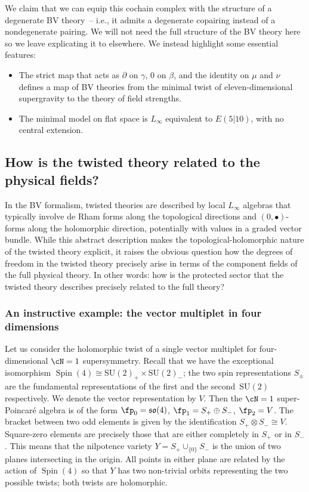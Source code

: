 \documentclass[10pt,a4paper]{amsart}
\numberwithin{equation}{section}
\theoremstyle{definition}
\def\lie#1{\ensuremath{\mathfrak{#1}}}
\DeclareMathOperator{\Spin}{Spin}
\def\so{\lie{so}}
\def\SU{\ensuremath{\mathrm{SU}}}
\begin{document}
We claim that we can equip this cochain complex with the structure of a degenerate BV theory~-- i.e., it admits a degenerate copairing instead of a nondegenerate pairing. We will not need the full structure of the BV theory here so we leave explicating it to elsewhere. We instead highlight some essential features:
\begin{itemize}\itemsep=0pt
 \item[--] The strict map that acts as $\partial$ on $\gamma$, $0$ on $\beta$, and the identity on $\mu$ and $\nu$ defines a map of BV theories from the minimal twist of eleven-dimensional supergravity to the theory of field strengths.
 \item[--] The minimal model on flat space is $L_\infty$ equivalent to $E(5|10)$, with no central extension.
\end{itemize}

\subsection{How is the twisted theory related to the physical fields?}
In the BV formalism, twisted theories are described by local $L_\infty$ algebras that typically involve de Rham forms along the topological directions and $(0,\bullet)$-forms along the holomorphic direction, potentially with values in a graded vector bundle. While this abstract description makes the topological-holomorphic nature of the twisted theory explicit, it raises the obvious question how the degrees of freedom in the twisted theory precisely arise in terms of the component fields of the full physical theory. In other words: how is the protected sector that the twisted theory describes precisely related to the full theory?

\subsubsection{An instructive example: the vector multiplet in four dimensions}
Let us consider the holomorphic twist of a single vector multiplet for four-dimensional $\cN=1$ supersymmetry. Recall that we have the exceptional isomorphism $\Spin(4) \cong \SU(2)_+ \times \SU(2)_-$; the two spin representations $S_\pm$ are the fundamental representations of the first and the second~$\SU(2)$ respectively. We denote the vector representation by $V$. Then the $\cN=1$ super-Poincar\'e algebra is of the form
$
 \fp_0 = \so(4)$, $\fp_1 = S_+ \oplus S_- $, $\fp_2 = V$.
The bracket between two odd elements is given by the identification $S_+ \otimes S_- \cong V$. Square-zero elements are precisely those that are either completely in $S_+$ or in $S_-$. This means that the nilpotence variety $Y=S_+ \cup_{\{0\}} S_-$ is the union of two planes intersecting in the origin. All points in either plane are related by the action of $\Spin(4)$ so that $Y$ has two non-trivial orbits representing the two possible twists; both twists are holomorphic.
\end{document}
